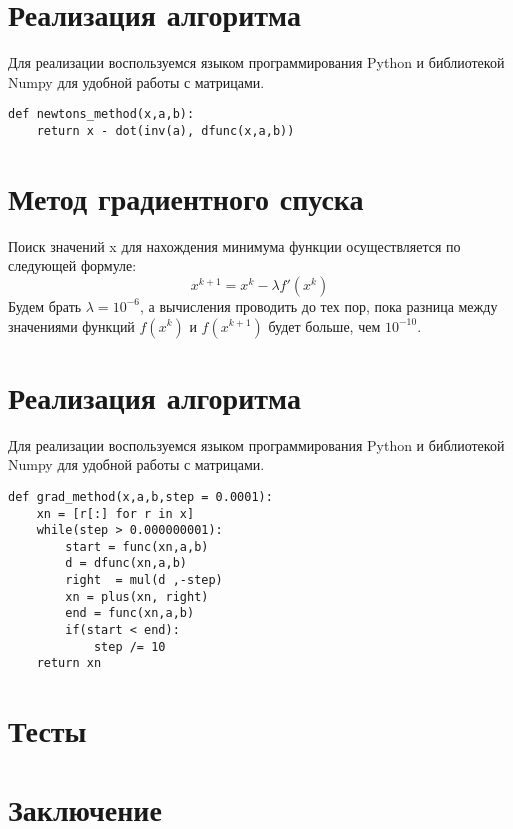 \documentclass[14pt, titlepage,fleqn]{extarticle}
\begin{document}
	\section*{Реализация алгоритма}
	Для реализации воспользуемся языком программирования Python и библиотекой Numpy для удобной работы с матрицами.
	\begin{lstlisting}[title=dwdw, captionpos=b]
		def newtons_method(x,a,b):
	return x - dot(inv(a), dfunc(x,a,b))
	\end{lstlisting}
	
	\section*{Метод градиентного спуска}
	Поиск значений x для нахождения минимума функции осуществляется по следующей формуле:
	\[x^{k+1} = x^k - \lambda f'(x^k)\]
	Будем брать $\lambda = 10^{-6}$, а вычисления проводить до тех пор, пока разница между значениями функций $f(x^k)$ и $f(x^{k+1})$ будет больше, чем $10^{-10}$.


	\section*{Реализация алгоритма}
	Для реализации воспользуемся языком программирования Python и библиотекой Numpy для удобной работы с матрицами.
	\begin{lstlisting}[title=dwdw, captionpos=b]
		def grad_method(x,a,b,step = 0.0001):
	xn = [r[:] for r in x]
	while(step > 0.000000001):
		start = func(xn,a,b)
		d = dfunc(xn,a,b)
		right  = mul(d ,-step)
		xn = plus(xn, right)
		end = func(xn,a,b)
		if(start < end):
			step /= 10
	return xn

	\end{lstlisting}





	\newpage
	\section*{Тесты}



	\newpage
	\section*{Заключение}
\end{document}
